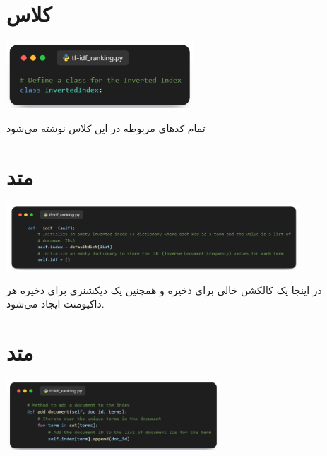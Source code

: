 \documentclass[12pt, dvipsnames, svgnames, x11names,]{article}
\begin{document}
	\section{کلاس }

		\begin{center}
			{\includegraphics[width=7cm]{images/02.png}}
		\end{center}

		{\normalsize تمام کدهای مربوطه در این کلاس نوشته می‌شود}


	
	\section{متد }
		
		\begin{center}
			{\includegraphics[width=11cm]{images/03.png}}
		\end{center}
		
		{\normalsize
			در اینجا یک کالکشن خالی برای ذخیره  و همچنین یک دیکشنری برای ذخیره  هر داکیومنت ایجاد می‌شود.
		} \par

	
	
	\section{متد }
		
		\begin{center}
			{\includegraphics[width=8cm]{images/04.png}}
		\end{center}
		
\end{document}
